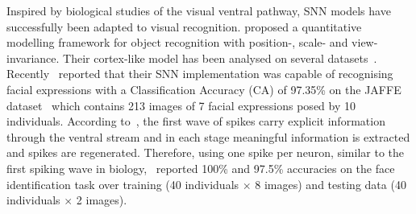 Inspired by biological studies of the visual ventral pathway, SNN models have successfully been adapted to visual recognition. \citet{riesenhuber1999hierarchical} proposed a quantitative modelling framework for object recognition with position-, scale- and view-invariance.
Their cortex-like model has been analysed on several datasets~\citep{serre2007robust}.
Recently~\citet{fu2012spiking} reported that their SNN implementation was capable of recognising facial expressions with a Classification Accuracy (CA) of 97.35\% on the JAFFE dataset~\citep{lyons1998coding} which contains 213 images of 7 facial expressions posed by 10 individuals.
According to~\citet{vanrullen2002surfing}, the first wave of spikes carry explicit information through the ventral stream and in each stage meaningful information is extracted and spikes are regenerated. 
Therefore, using one spike per neuron, similar to the first spiking wave in biology,~\citet{delorme2001face} reported 100\% and 97.5\% accuracies on the face identification task over
training (40 individuals $\times$ 8 images) and testing data (40 individuals $\times$ 2 images).

